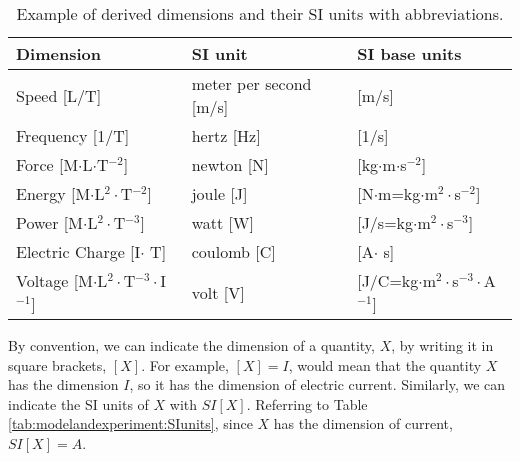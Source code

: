 \begin{table}[!h]
\centering
\begin{tabular}{lll }  
\textbf{Dimension}&\textbf{SI unit}&\textbf{SI base units}\\
\hline
\hline
Speed [L/T]& meter per second [m/s] & [m/s]\\ \hline
Frequency [1/T]& hertz [Hz] & [1/s]\\ \hline
Force [M$\cdot$L$\cdot$T$^{-2}$]& newton [N]&[kg$\cdot$m$\cdot$s$^{-2}$]\\ \hline
Energy [M$\cdot$L$^2\cdot$T$^{-2}$]& joule [J]&[N$\cdot$m=kg$\cdot$m$^2\cdot$s$^{-2}$] \\ \hline
Power [M$\cdot$L$^2\cdot$T$^{-3}$]& watt [W]&[J/s=kg$\cdot$m$^2\cdot$s$^{-3}$]\\ \hline
Electric Charge [I$\cdot$ T]& coulomb [C]&[A$\cdot$ s] \\ \hline
Voltage [M$\cdot$L$^2\cdot$T$^{-3}\cdot$I$^{-1}$]& volt [V]&[J/C=kg$\cdot$m$^2\cdot$s$^{-3}\cdot$A$^{-1}$] \\ \hline
\end{tabular}
\caption{\label{tab:modelandexperiment:derivedSIunits} Example of derived dimensions and their SI units with abbreviations.}
\end{table}

By convention, we can indicate the dimension of a quantity, $X$, by writing it in square brackets, $[X]$. For example, $[X]=I$, would mean that the quantity $X$ has the dimension $I$, so it has the dimension of electric current. Similarly, we can indicate the SI units of $X$ with $SI[X]$. Referring to Table \ref{tab:modelandexperiment:SIunits}, since $X$ has the dimension of current, $SI[X]=A$.

